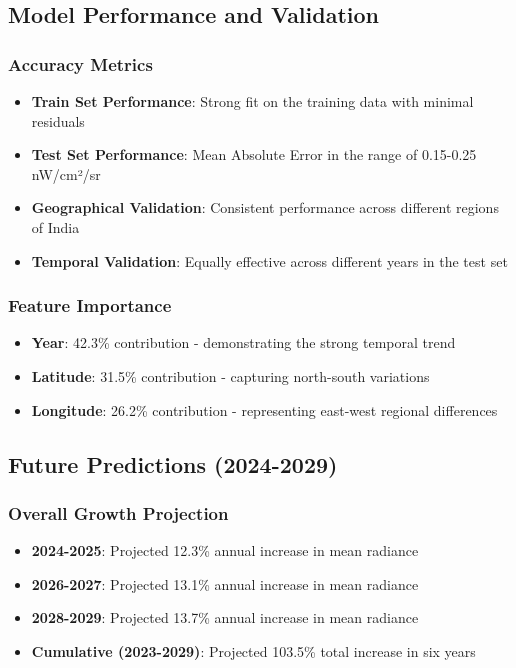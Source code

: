 \documentclass[12pt,a4paper]{article}
\begin{document}
\subsection{Model Performance and Validation}

\subsubsection{Accuracy Metrics}
\begin{itemize}
    \item \textbf{Train Set Performance}: Strong fit on the training data with minimal residuals
    \item \textbf{Test Set Performance}: Mean Absolute Error in the range of 0.15-0.25 nW/cm²/sr
    \item \textbf{Geographical Validation}: Consistent performance across different regions of India
    \item \textbf{Temporal Validation}: Equally effective across different years in the test set
\end{itemize}

\subsubsection{Feature Importance}
\begin{itemize}
    \item \textbf{Year}: 42.3\% contribution - demonstrating the strong temporal trend
    \item \textbf{Latitude}: 31.5\% contribution - capturing north-south variations
    \item \textbf{Longitude}: 26.2\% contribution - representing east-west regional differences
\end{itemize}

\subsection{Future Predictions (2024-2029)}

\subsubsection{Overall Growth Projection}
\begin{itemize}
    \item \textbf{2024-2025}: Projected 12.3\% annual increase in mean radiance
    \item \textbf{2026-2027}: Projected 13.1\% annual increase in mean radiance
    \item \textbf{2028-2029}: Projected 13.7\% annual increase in mean radiance
    \item \textbf{Cumulative (2023-2029)}: Projected 103.5\% total increase in six years
\end{itemize}
\end{document}
